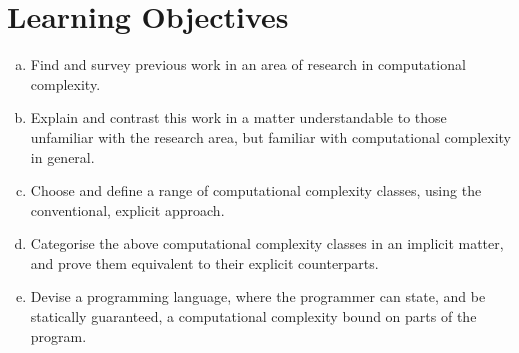 
\section{Learning Objectives}

\begin{enumerate}[(a)]

\item Find and survey previous work in an area of research in computational
complexity. 

\item Explain and contrast this work in a matter understandable to those
unfamiliar with the research area, but familiar with computational complexity
in general.

\item Choose and define a range of computational complexity classes, using the
conventional, explicit approach.

\item Categorise the above computational complexity classes in an implicit
matter, and prove them equivalent to their explicit counterparts.

\item Devise a programming language, where the programmer can state, and be
statically guaranteed, a computational complexity bound on parts of the
program.

\end{enumerate}
